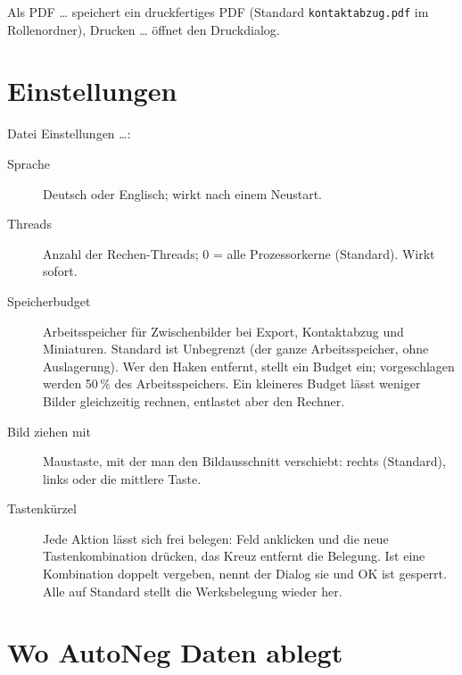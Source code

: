 \documentclass[a4paper,11pt,parskip=half,DIV=12]{scrartcl}
\newcommand{\menu}[1]{\textsf{#1}}                    %
\newcommand{\datei}[1]{\texttt{#1}}                   %
\begin{document}
\menu{Als PDF …} speichert ein druckfertiges PDF (Standard \datei{kontaktabzug.pdf} im
Rollenordner), \menu{Drucken …} öffnet den Druckdialog.

\section{Einstellungen}

\menu{Datei \textrightarrow{} Einstellungen …}:
\begin{description}
  \item[Sprache] Deutsch oder Englisch; wirkt nach einem Neustart.
  \item[Threads] Anzahl der Rechen-Threads; 0 = alle Prozessorkerne (Standard). Wirkt sofort.
  \item[Speicherbudget] Arbeitsspeicher für Zwischenbilder bei Export, Kontaktabzug und
        Miniaturen. Standard ist \menu{Unbegrenzt} (der ganze Arbeitsspeicher, ohne
        Auslagerung). Wer den Haken entfernt, stellt ein Budget ein; vorgeschlagen werden
        50\,\% des Arbeitsspeichers. Ein kleineres Budget lässt weniger Bilder gleichzeitig
        rechnen, entlastet aber den Rechner.
  \item[Bild ziehen mit] Maustaste, mit der man den Bildausschnitt verschiebt: rechts (Standard),
        links oder die mittlere Taste.
  \item[Tastenkürzel] Jede Aktion lässt sich frei belegen: Feld anklicken und die neue
        Tastenkombination drücken, das Kreuz entfernt die Belegung. Ist eine Kombination
        doppelt vergeben, nennt der Dialog sie und \menu{OK} ist gesperrt. \menu{Alle auf
        Standard} stellt die Werksbelegung wieder her.
\end{description}

\section{Wo AutoNeg Daten ablegt}\label{sec:daten}
\end{document}

